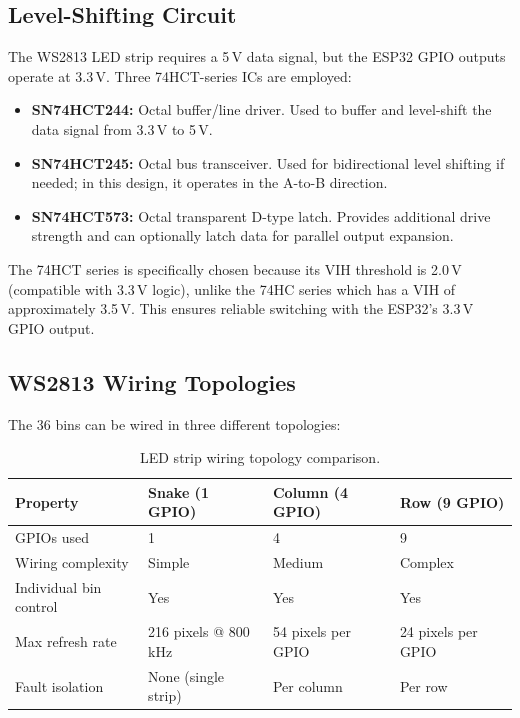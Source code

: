 \subsection{Level-Shifting Circuit}
\label{sec:level-shift}

The WS2813 LED strip requires a 5\,V data signal, but the ESP32 GPIO outputs operate at 3.3\,V. Three 74HCT-series ICs are employed:

\begin{itemize}
  \item \textbf{SN74HCT244:} Octal buffer/line driver. Used to buffer and level-shift the data signal from 3.3\,V to 5\,V.
  \item \textbf{SN74HCT245:} Octal bus transceiver. Used for bidirectional level shifting if needed; in this design, it operates in the A-to-B direction.
  \item \textbf{SN74HCT573:} Octal transparent D-type latch. Provides additional drive strength and can optionally latch data for parallel output expansion.
\end{itemize}

The 74HCT series is specifically chosen because its VIH threshold is 2.0\,V (compatible with 3.3\,V logic)\cite{sn74hct573_ds}, unlike the 74HC series which has a VIH of approximately 3.5\,V. This ensures reliable switching with the ESP32's 3.3\,V GPIO output.

\subsection{WS2813 Wiring Topologies}
\label{sec:wiring}

The 36 bins can be wired in three different topologies:

\begin{table}[H]
  \centering
  \caption{LED strip wiring topology comparison.}
  \label{tab:topology}
  \begin{tabular}{p{2.5cm} p{3.5cm} p{3.5cm} p{3.5cm}}
    \toprule
    \textbf{Property} & \textbf{Snake (1 GPIO)} & \textbf{Column (4 GPIO)} & \textbf{Row (9 GPIO)} \\
    \midrule
    GPIOs used & 1 & 4 & 9 \\
    Wiring complexity & Simple & Medium & Complex \\
    Individual bin control & Yes & Yes & Yes \\
    Max refresh rate & 216 pixels @ 800\,kHz & 54 pixels per GPIO & 24 pixels per GPIO \\
    Fault isolation & None (single strip) & Per column & Per row \\
    \bottomrule
  \end{tabular}
\end{table}

